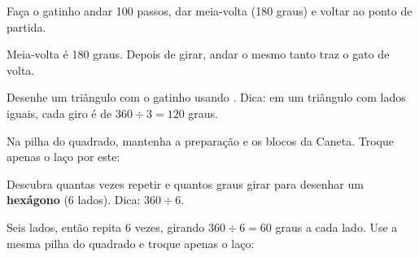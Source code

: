 \begin{solucao}
\begin{pilha}
\end{pilha}
\end{solucao}

\begin{exercicio}
Faça o gatinho andar 100 passos, dar meia-volta (180 graus) e voltar ao ponto de partida.
\end{exercicio}

\begin{solucao}
Meia-volta é 180 graus. Depois de girar, andar o mesmo tanto traz o gato de volta.
\begin{pilha}
\end{pilha}
\end{solucao}

\begin{exercicio}[Triângulo]
Desenhe um triângulo com o gatinho usando . Dica: em um triângulo com lados iguais, cada giro é de $360 \div 3 = 120$ graus.
\end{exercicio}

\begin{solucao}
Na pilha do quadrado, mantenha a preparação e os blocos da Caneta. Troque apenas o laço por este:
\begin{pilha}
\sbcend
\end{pilha}
\end{solucao}

\begin{desafio}
Descubra quantas vezes repetir e quantos graus girar para desenhar um \textbf{hexágono} (6 lados). Dica: $360 \div 6$.
\end{desafio}

\begin{solucao}
Seis lados, então repita 6 vezes, girando $360 \div 6 = 60$ graus a cada lado.
Use a mesma pilha do quadrado e troque apenas o laço:
\begin{pilha}
\sbcend
\end{pilha}
\end{solucao}

